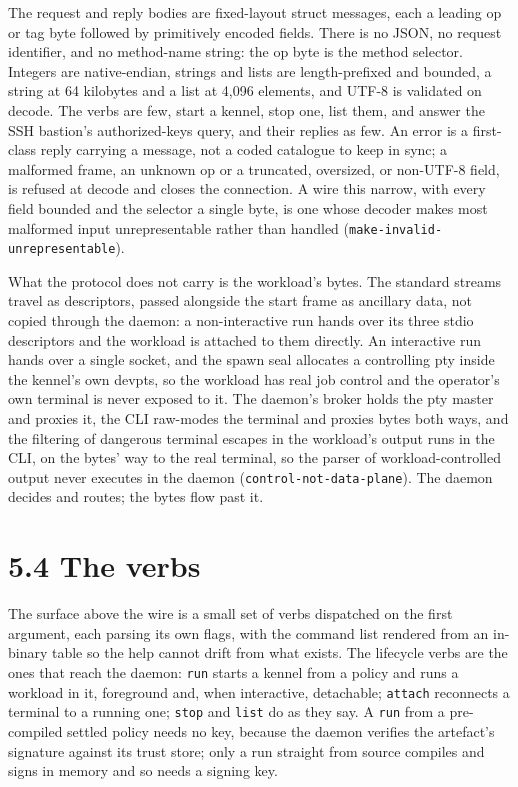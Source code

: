 The request and reply bodies are fixed-layout struct messages, each a
leading op or tag byte followed by primitively encoded fields. There is
no JSON, no request identifier, and no method-name string: the op byte
is the method selector. Integers are native-endian, strings and lists
are length-prefixed and bounded, a string at 64 kilobytes and a list at
4,096 elements, and UTF-8 is validated on decode. The verbs are few,
start a kennel, stop one, list them, and answer the SSH bastion's
authorized-keys query, and their replies as few. An error is a
first-class reply carrying a message, not a coded catalogue to keep in
sync; a malformed frame, an unknown op or a truncated, oversized, or
non-UTF-8 field, is refused at decode and closes the connection. A wire
this narrow, with every field bounded and the selector a single byte, is
one whose decoder makes most malformed input unrepresentable rather than
handled (\texttt{make-invalid-unrepresentable}).

What the protocol does not carry is the workload's bytes. The standard
streams travel as descriptors, passed alongside the start frame as
ancillary data, not copied through the daemon: a non-interactive run
hands over its three stdio descriptors and the workload is attached to
them directly. An interactive run hands over a single socket, and the
spawn seal allocates a controlling pty inside the kennel's own devpts,
so the workload has real job control and the operator's own terminal is
never exposed to it. The daemon's broker holds the pty master and
proxies it, the CLI raw-modes the terminal and proxies bytes both ways,
and the filtering of dangerous terminal escapes in the workload's output
runs in the CLI, on the bytes' way to the real terminal, so the parser
of workload-controlled output never executes in the daemon
(\texttt{control-not-data-plane}). The daemon decides and routes; the
bytes flow past it.

\hypertarget{the-verbs}{%
\section{5.4 The verbs}\label{the-verbs}}

The surface above the wire is a small set of verbs dispatched on the
first argument, each parsing its own flags, with the command list
rendered from an in-binary table so the help cannot drift from what
exists. The lifecycle verbs are the ones that reach the daemon:
\texttt{run} starts a kennel from a policy and runs a workload in it,
foreground and, when interactive, detachable; \texttt{attach} reconnects
a terminal to a running one; \texttt{stop} and \texttt{list} do as they
say. A \texttt{run} from a pre-compiled settled policy needs no key,
because the daemon verifies the artefact's signature against its trust
store; only a run straight from source compiles and signs in memory and
so needs a signing key.

